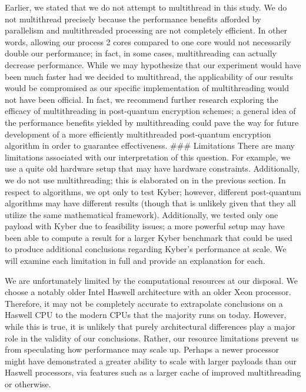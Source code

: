 \documentclass[12pt]{article}
\begin{document}
Earlier, we stated that we do not attempt to multithread in this study. We do not multithread precisely because the performance benefits afforded by parallelism and multithreaded processing are not completely efficient. In other words, allowing our process 2 cores compared to one core would not necessarily double our performance; in fact, in some cases, multithreading can actually decrease performance. While we may hypothesize that our experiment would have been much faster had we decided to multithread, the applicability of our results would be compromised as our specific implementation of multithreading would not have been official. In fact, we recommend further research exploring the efficacy of multithreading in post-quantum encryption schemes; a general idea of the performance benefits yielded by multithreading could pave the way for future development of a more efficiently multithreaded post-quantum encryption algorithm in order to guarantee effectiveness. 
### Limitations
There are many limitations associated with our interpretation of this question. For example, we use a quite old hardware setup that may have hardware constraints. Additionally, we do not use multithreading; this is elaborated on in the previous section. In respect to algorithms, we opt only to test Kyber; however, different post-quantum algorithms may have different results (though that is unlikely given that they all utilize the same mathematical framework). Additionally, we tested only one payload with Kyber due to feasibility issues; a more powerful setup may have been able to compute a result for a larger Kyber benchmark that could be used to produce additional conclusions regarding Kyber's performance at scale. We will examine each limitation in full and provide an explanation for each. 

We are unfortunately limited by the computational resources at our disposal. We choose a notably older Intel Haswell architecture with an older Xeon processor. Therefore, it may not be completely accurate to extrapolate conclusions on a Haswell CPU to the modern CPUs that the majority runs on today. However, while this is true, it is unlikely that purely architectural differences play a major role in the validity of our conclusions. Rather, our resource limitations prevent us from speculating how performance may scale up. Perhaps a newer processor might have demonstrated a greater ability to scale with larger payloads than our Haswell processors, via features such as a larger cache of improved multithreading or otherwise. 
\end{document}
